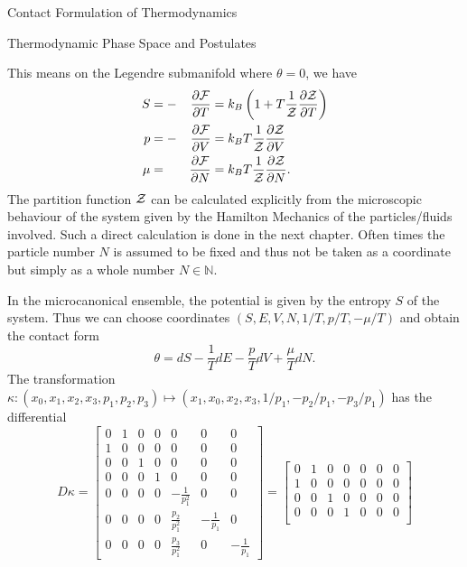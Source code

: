 \begin{section}{Contact Formulation of Thermodynamics}
\begin{subsection}{Thermodynamic Phase Space and Postulates}
\begin{example}
\begin{equation}
	\end{equation}
	This means on the Legendre submanifold where $\theta=0$, we have
	\begin{alignat}{3}
		S &= - &\frac{\partial\mathcal{F}}{\partial T} &= k_B\left(1+T\frac{1}{\mathcal{Z}}\frac{\partial\mathcal{Z}}{\partial T}\right)\\
		p &= - &\frac{\partial\mathcal{F}}{\partial V} &= k_BT\frac{1}{\mathcal{Z}}\frac{\partial\mathcal{Z}}{\partial V}\\
		\mu &= &\frac{\partial\mathcal{F}}{\partial N} &= k_BT\frac{1}{\mathcal{Z}}\frac{\partial\mathcal{Z}}{\partial N}.
	\end{alignat}
	The partition function $\mathcal{Z}$ can be calculated explicitly from the microscopic behaviour of the system given by the Hamilton Mechanics of the particles/fluids involved. Such a direct calculation is done in the next chapter. Often times the particle number $N$ is assumed to be fixed and thus not be taken as a coordinate but simply as a whole number $N\in\mathbb{N}$.
\end{example}
\begin{example}
	In the microcanonical ensemble, the potential is given by the entropy $S$ of the system. Thus we can choose coordinates $(S,E,V,N,1/T,p/T,-\mu/T)$ and obtain the contact form
	\begin{equation}
		\theta = dS - \frac{1}{T}dE - \frac{p}{T}dV + \frac{\mu}{T}dN.
	\end{equation}
	The transformation $\kappa:(x_0,x_1,x_2,x_3,p_1,p_2,p_3)\mapsto(x_1,x_0,x_2,x_3,1/p_1,-p_2/p_1,-p_3/p_1)$ has the differential
	\begin{equation}
		D\kappa = 
		\begin{bmatrix}
			0 	&	1 	&	0	&	0	&	0	&	0	&	0\\
			1	&	0	&	0	&	0	&	0	&	0	&	0\\
			0	&	0	&	1	&	0	&	0	&	0	&	0\\
			0	&	0	&	0	&	1	&	0	&	0	&	0\\
			0	&	0	&	0	&	0	& -\frac{1}{p_1^2} &	0	&	0\\
			0	&	0	&	0	&	0	& \frac{p_2}{p_1^2} & -\frac{1}{p_1} & 0\\
			0	&	0	&	0	&	0	& \frac{p_3}{p_1^2} & 0 & -\frac{1}{p_1}
		\end{bmatrix}
		=
		\begin{bmatrix}
			0 	&	1 	&	0	&	0	&	0	&	0	&	0\\
			1	&	0	&	0	&	0	&	0	&	0	&	0\\
			0	&	0	&	1	&	0	&	0	&	0	&	0\\
			0	&	0	&	0	&	1	&	0	&	0	&	0\\

\end{bmatrix}
\end{equation}
\end{example}
\end{subsection}
\end{section}
